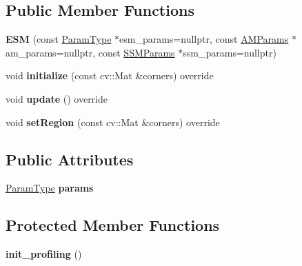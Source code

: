 \subsection*{Public Member Functions}
\begin{DoxyCompactItemize}
\item 
\hypertarget{classESM_ac953fa7deaee7a9264372f6dcba44a66}{{\bfseries E\-S\-M} (const \hyperlink{structESMParams}{Param\-Type} $\ast$esm\-\_\-params=nullptr, const \hyperlink{structAMParams}{A\-M\-Params} $\ast$am\-\_\-params=nullptr, const \hyperlink{structSSMParams}{S\-S\-M\-Params} $\ast$ssm\-\_\-params=nullptr)}\label{classESM_ac953fa7deaee7a9264372f6dcba44a66}

\item 
\hypertarget{classESM_ae5ec5d4f28ae33d4a2080096c2f8482c}{void {\bfseries initialize} (const cv\-::\-Mat \&corners) override}\label{classESM_ae5ec5d4f28ae33d4a2080096c2f8482c}

\item 
\hypertarget{classESM_a43a8457c148f57a0d56b3f857efb60ce}{void {\bfseries update} () override}\label{classESM_a43a8457c148f57a0d56b3f857efb60ce}

\item 
\hypertarget{classESM_a43390c8a9b71b7fac668519e56371aa5}{void {\bfseries set\-Region} (const cv\-::\-Mat \&corners) override}\label{classESM_a43390c8a9b71b7fac668519e56371aa5}

\end{DoxyCompactItemize}
\subsection*{Public Attributes}
\begin{DoxyCompactItemize}
\item 
\hypertarget{classESM_ad4dd514e166aff60c889b194d7126025}{\hyperlink{structESMParams}{Param\-Type} {\bfseries params}}\label{classESM_ad4dd514e166aff60c889b194d7126025}

\end{DoxyCompactItemize}
\subsection*{Protected Member Functions}
\begin{DoxyCompactItemize}
\item 
\hypertarget{classESM_a94615f6ec2c83d02b2479a6350906ee4}{{\bfseries init\-\_\-profiling} ()}\label{classESM_a94615f6ec2c83d02b2479a6350906ee4}

\end{DoxyCompactItemize}

